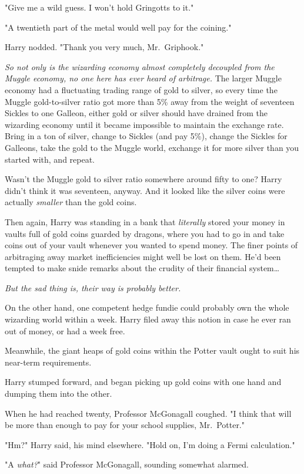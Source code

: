 "Give me a wild guess. I won't hold Gringotts to it."

"A twentieth part of the metal would well pay for the coining."

Harry nodded. "Thank you very much, Mr.~Griphook."

\emph{So not only is the wizarding economy almost completely decoupled from the
Muggle economy, no one here has ever heard of arbitrage.} The larger Muggle
economy had a fluctuating trading range of gold to silver, so every time the
Muggle gold-to-silver ratio got more than 5\% away from the weight of seventeen
Sickles to one Galleon, either gold or silver should have drained from the
wizarding economy until it became impossible to maintain the exchange rate.
Bring in a ton of silver, change to Sickles (and pay 5\%), change the Sickles
for Galleons, take the gold to the Muggle world, exchange it for more silver
than you started with, and repeat.

Wasn't the Muggle gold to silver ratio somewhere around fifty to one? Harry
didn't think it was seventeen, anyway. And it looked like the silver coins were
actually \emph{smaller} than the gold coins.

Then again, Harry was standing in a bank that \emph{literally} stored your
money in vaults full of gold coins guarded by dragons, where you had to go in
and take coins out of your vault whenever you wanted to spend money. The finer
points of arbitraging away market inefficiencies might well be lost on them.
He'd been tempted to make snide remarks about the crudity of their financial
system{\ldots}

\emph{But the sad thing is, their way is probably better.}

On the other hand, one competent hedge fundie could probably own the whole
wizarding world within a week. Harry filed away this notion in case he ever ran
out of money, or had a week free.

Meanwhile, the giant heaps of gold coins within the Potter vault ought to suit
his near-term requirements.

Harry stumped forward, and began picking up gold coins with one hand and
dumping them into the other.

When he had reached twenty, Professor McGonagall coughed. "I think that will be
more than enough to pay for your school supplies, Mr.~Potter."

"Hm?" Harry said, his mind elsewhere. "Hold on, I'm doing a Fermi calculation."

"A \emph{what?}" said Professor McGonagall, sounding somewhat alarmed.

